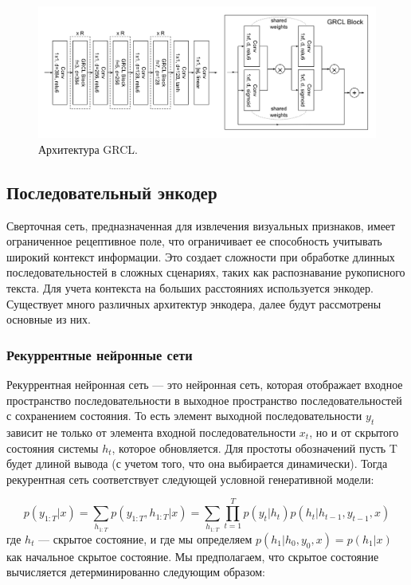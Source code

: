 \begin{figure}
    \centering
    \includegraphics[scale=0.3]{./images/GRCL.png}
    \caption{\protect\hypertarget{image4}{Архитектура GRCL.}}
\end{figure}

\subsection{Последовательный энкодер}
Сверточная сеть, предназначенная для извлечения визуальных признаков, имеет ограниченное рецептивное поле, что ограничивает ее способность учитывать широкий контекст информации. Это создает сложности при обработке длинных последовательностей в сложных сценариях, таких как распознавание рукописного текста. Для учета контекста на больших расстояниях используется энкодер. Существует много различных
архитектур энкодера, далее будут рассмотрены основные из них.

\subsubsection{Рекуррентные нейронные сети}
Рекуррентная нейронная сеть — это нейронная сеть, которая отображает входное пространство последовательности в выходное пространство последовательностей с сохранением состояния. То есть элемент выходной последовательности $y_t$ зависит не только от элемента входной последовательности $x_t$, но и от скрытого состояния системы $h_t$, которое обновляется. Для простоты обозначений пусть T будет длиной вывода (с учетом того, что она выбирается динамически). Тогда рекурентная сеть соответствует следующей условной генеративной модели:

\begin{equation}
	p(y_{1:T} | x) = \sum_{h_{1:T}} p(y_{1:T}, h_{1:T} | x) = \sum_{h_{1:T}} \prod_{t=1}^{T} p(y_{t} | h_{t})p(h_{t} | h_{t-1}, y_{t-1}, x)
\end{equation}
где $h_t$ — скрытое состояние, и где мы определяем $p(h_1 |h_0, y_0, x) = p(h_1 |x)$ как начальное скрытое состояние. Мы предполагаем, что скрытое состояние вычисляется детерминированно следующим образом:

